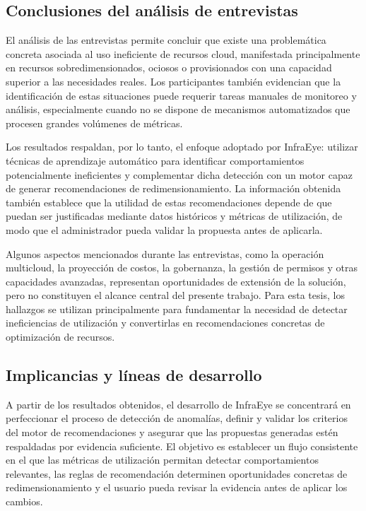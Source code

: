 \subsection{Conclusiones del análisis de entrevistas}

El análisis de las entrevistas permite concluir que existe una problemática concreta asociada al uso ineficiente de recursos cloud, manifestada principalmente en recursos sobredimensionados, ociosos o provisionados con una capacidad superior a las necesidades reales. Los participantes también evidencian que la identificación de estas situaciones puede requerir tareas manuales de monitoreo y análisis, especialmente cuando no se dispone de mecanismos automatizados que procesen grandes volúmenes de métricas.

Los resultados respaldan, por lo tanto, el enfoque adoptado por InfraEye: utilizar técnicas de aprendizaje automático para identificar comportamientos potencialmente ineficientes y complementar dicha detección con un motor capaz de generar recomendaciones de redimensionamiento. La información obtenida también establece que la utilidad de estas recomendaciones depende de que puedan ser justificadas mediante datos históricos y métricas de utilización, de modo que el administrador pueda validar la propuesta antes de aplicarla.

Algunos aspectos mencionados durante las entrevistas, como la operación multicloud, la proyección de costos, la gobernanza, la gestión de permisos y otras capacidades avanzadas, representan oportunidades de extensión de la solución, pero no constituyen el alcance central del presente trabajo. Para esta tesis, los hallazgos se utilizan principalmente para fundamentar la necesidad de detectar ineficiencias de utilización y convertirlas en recomendaciones concretas de optimización de recursos.

\subsection{Implicancias y líneas de desarrollo}

A partir de los resultados obtenidos, el desarrollo de InfraEye se concentrará en perfeccionar el proceso de detección de anomalías, definir y validar los criterios del motor de recomendaciones y asegurar que las propuestas generadas estén respaldadas por evidencia suficiente. El objetivo es establecer un flujo consistente en el que las métricas de utilización permitan detectar comportamientos relevantes, las reglas de recomendación determinen oportunidades concretas de redimensionamiento y el usuario pueda revisar la evidencia antes de aplicar los cambios.

